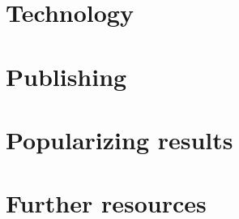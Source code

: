\chapter{Technology}
\label{ch:technology}


\chapter{Publishing}
\label{ch:publishing}


\chapter{Popularizing results}
\label{ch:popularizing}


\chapter{Further resources}
\label{ch:resources}

